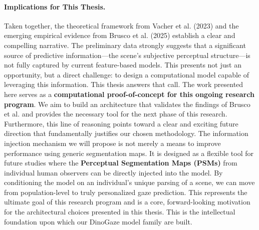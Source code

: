 \paragraph{Implications for This Thesis.} Taken together, the theoretical framework from Vacher et al. (2023) and the emerging empirical evidence from Brusco et al. (2025) establish a clear and compelling narrative. The preliminary data strongly suggests that a significant source of predictive information—the scene's subjective perceptual structure—is not fully captured by current feature-based models. This presents not just an opportunity, but a direct challenge: to design a computational model capable of leveraging this information.
This thesis answers that call. The work presented here serves as a \textbf{computational proof-of-concept for this ongoing research program}. We aim to build an architecture that validates the findings of Brusco et al. and provides the necessary tool for the next phase of this research.
Furthermore, this line of reasoning points toward a clear and exciting future direction that fundamentally justifies our chosen methodology. The information injection mechanism we will propose is not merely a means to improve performance using generic segmentation maps. It is designed as a flexible tool for future studies where the \textbf{Perceptual Segmentation Maps (PSMs)} from individual human observers can be directly injected into the model. By conditioning the model on an individual's unique parsing of a scene, we can move from population-level to truly personalized gaze prediction. This represents the ultimate goal of this research program and is a core, forward-looking motivation for the architectural choices presented in this thesis. This is the intellectual foundation upon which our DinoGaze model family are built.
